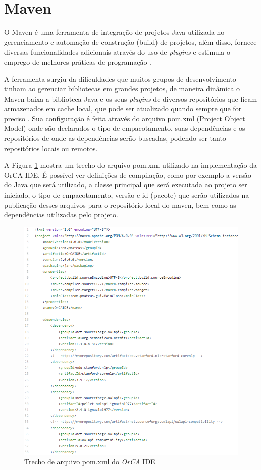 \documentclass{bcc}
\begin{document}
\section{Maven}

O Maven é uma ferramenta de integração de projetos Java utilizada no gerenciamento e automação de construção (build) de projetos, além disso, fornece diversas funcionalidades adicionais através do uso de \textit{plugins} e estimula o emprego de melhores práticas de programação \cite{maven}.

A ferramenta surgiu da dificuldades que muitos grupos de desenvolvimento tinham ao gerenciar bibliotecas em grandes projetos, de maneira dinâmica o Maven baixa a biblioteca Java e os seus \textit{plugins} de diversos repositórios que ficam armazenados em cache local, que pode ser atualizado quando sempre que for preciso \cite{oliveira2016}. Sua configuração é feita através do arquivo pom.xml (Project Object Model) onde são declarados o tipo de empacotamento, suas dependências e os repositórios de onde as dependências serão buscadas, podendo ser tanto repositórios locais ou remotos. \cite{junior2014}

A Figura \ref{fig:pom_xml} mostra um trecho do arquivo pom.xml utilizado na implementação da OrCA IDE. É possível ver definições de compilação, como por exemplo a versão do Java que será utilizado, a classe principal que será executada ao projeto ser iniciado, o tipo de empacotamento, versão e id (pacote) que serão utilizados na publicação desses arquivos para o repositório local do maven, bem como as dependências utilizadas pelo projeto.

\begin{figure}[H]
\centering
\includegraphics[width=1\textwidth]{Figuras/pom_xml.png}
\caption{Trecho de arquivo pom.xml do \textit{OrCA} IDE}
\label{fig:pom_xml}
\end{figure}
\end{document}
